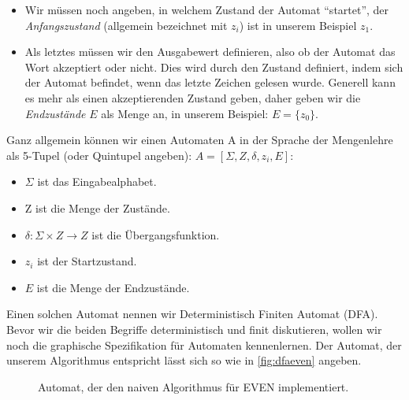 \begin{itemize}
    \item Wir müssen noch angeben, in welchem Zustand der Automat ``startet'',
        der \emph{Anfangszustand} (allgemein bezeichnet mit $z_i$)
        ist in unserem Beispiel $z_1$.

    \item Als letztes müssen wir den Ausgabewert definieren,
        also ob der Automat das Wort akzeptiert oder nicht.
        Dies wird durch den Zustand definiert, indem sich der Automat
        befindet, wenn das letzte Zeichen gelesen wurde.
        Generell kann es mehr als einen akzeptierenden Zustand geben,
        daher geben wir die \emph{Endzustände} $E$ als Menge an,
        in unserem Beispiel: $E = \{z_0\}$.
\end{itemize}

Ganz allgemein können wir einen Automaten A in der Sprache der Mengenlehre
als 5-Tupel (oder Quintupel angeben): $A = [\Sigma, Z, \delta, z_i, E]$:
\begin{itemize}
    \item $\Sigma$ ist das Eingabealphabet.
    \item Z ist die Menge der Zustände.
    \item $\delta: \Sigma \times Z \rightarrow Z$ ist die Übergangsfunktion.
    \item $z_i$ ist der Startzustand.
    \item $E$ ist die Menge der Endzustände.
\end{itemize}
Einen solchen Automat nennen wir Deterministisch Finiten Automat (DFA).
Bevor wir die beiden Begriffe deterministisch und finit diskutieren,
wollen wir noch die graphische Spezifikation für Automaten kennenlernen. 
Der Automat,
der unserem Algorithmus entspricht lässt sich so wie in \autoref{fig:dfaeven} angeben.

\begin{figure}[ht] %
\centering %
\caption{Automat, der den naiven Algorithmus für EVEN implementiert.}
\label{fig:dfaeven}
\end{figure}

